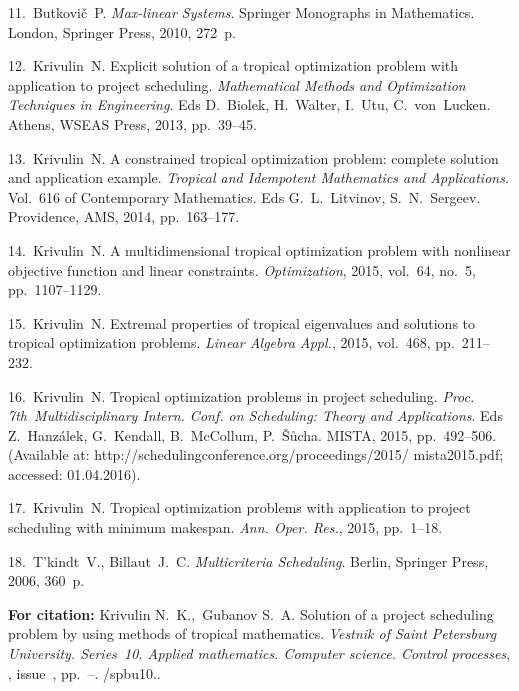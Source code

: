 {11.~Butkovi\v{c}~P. \textit{Max-linear Systems}. Springer
Monographs in Mathematics. London, Springer Press, 2010, 272~p.

12.~Krivulin~N. Explicit solution of a tropical optimization
problem with application to project scheduling.
\textit{Mathematical Methods and Optimization Techniques in
Engineering}. Eds D.~Biolek, H.~Walter, I.~Utu, C.~von~Lucken.
Athens, WSEAS Press, 2013, pp.~39--45.

13.~Krivulin~N. A constrained tropical optimization problem:
complete solution and application example. \textit{Tropical and
Idempotent Mathematics and Applications}. Vol.~616 of Contemporary
Mathematics. Eds G.~L.~Litvinov, S.~N.~Sergeev. Providence, AMS,
2014, pp.~163--177.

14.~Krivulin~N. A multidimensional tropical optimization problem
with nonlinear objective function and linear constraints.
\textit{Optimization}, 2015, vol.~64, no.~5, pp.~1107--1129.

15.~Krivulin~N. Extremal properties of tropical eigenvalues and
solutions to tropical optimization problems. \textit{Linear
Algebra Appl.}, 2015, vol.~468, pp.~211--232.

16.~Krivulin~N. Tropical optimization problems in project
scheduling. \textit{Proc. 7th~Multidisciplinary Intern. Conf. on
Scheduling: Theory and Applications}. Eds Z.~Hanz\'{a}lek,
G.~Kendall, B.~McCollum, P.~\v{S}\r{u}cha. MISTA, 2015,
pp.~492--506. (Available at:
http://schedulingconference.org/proceedings/2015/ mista2015.pdf;
accessed: 01.04.2016).

17.~Krivulin~N. Tropical optimization problems with application to
project scheduling with minimum makespan. \textit{Ann. Oper.
Res.}, 2015, pp.~1--18.

18.~T'kindt~V., Billaut~J.~C. \textit{Multicriteria Scheduling}.
Berlin, Springer Press, 2006, 360~p.


\vskip 2mm

{\bf For citation:} Krivulin N.~K.,~Gubanov S.~A. Solution of a
project scheduling problem by using methods of tropical
mathematics. {\it Vestnik of Saint Petersburg University.
Series~10. Applied mathematics. Computer science. Control
processes}, \issueyear, issue~\issuenum,
pp.~\pageref{p6}--\pageref{p6e}.
\doivyp/spbu10.\issueyear.


}
